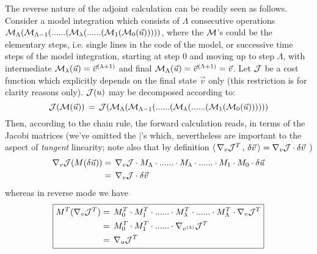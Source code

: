 The {\sf reverse} nature of the adjoint calculation can be readily 
seen as follows. 
Consider a model integration which consists of $ \Lambda $
consecutive operations
$ {\cal M}_{\Lambda} (  {\cal M}_{\Lambda-1} ( 
...... ( {\cal M}_{\lambda} (
......
( {\cal M}_{1} ( {\cal M}_{0}(\vec{u}) )))) $,
where the ${\cal M}$'s could be the elementary steps, i.e. single lines
in the code of the model, or successive time steps of the
model integration, 
starting at step 0 and moving up to step $\Lambda$, with intermediate
${\cal M}_{\lambda} (\vec{u}) = \vec{v}^{(\lambda+1)}$ and final 
${\cal M}_{\Lambda} (\vec{u}) = \vec{v}^{(\Lambda+1)} = \vec{v}$.
Let ${\cal J}$ be a cost function which explicitly depends on the
final state $\vec{v}$ only
(this restriction is for clarity reasons only).
%
${\cal J}(u)$ may be decomposed according to:
%
\begin{equation}
{\cal J}({\cal M}(\vec{u})) \, = \, 
{\cal J} ( {\cal M}_{\Lambda} (  {\cal M}_{\Lambda-1} ( 
...... ( {\cal M}_{\lambda} (
......
( {\cal M}_{1} ( {\cal M}_{0}(\vec{u}) )))))
\label{compos}
\end{equation}
%
Then, according to the chain rule, the forward calculation reads, 
in terms of the Jacobi matrices
(we've omitted the $ | $'s which, nevertheless are important
to the aspect of {\it tangent} linearity;
note also that by definition
$ \langle \, \nabla _{v}{\cal J}^T \, , \, \delta \vec{v} \, \rangle
= \nabla_v {\cal J} \cdot \delta \vec{v} $ )
%
\begin{equation}
\begin{split}
\nabla_v {\cal J} (M(\delta \vec{u})) & = \,
\nabla_v {\cal J} \cdot M_{\Lambda}
\cdot ...... \cdot M_{\lambda} \cdot ...... \cdot
M_{1} \cdot M_{0} \cdot \delta \vec{u} \\
~ & = \, \nabla_v {\cal J} \cdot \delta \vec{v} \\
\end{split}
\label{forward}
\end{equation}
%
whereas in reverse mode we have
%
\begin{equation}
\boxed{
\begin{split}
M^T ( \nabla_v {\cal J}^T) & = \,
M_{0}^T \cdot M_{1}^T
\cdot ...... \cdot M_{\lambda}^T \cdot ...... \cdot 
M_{\Lambda}^T \cdot \nabla_v {\cal J}^T \\
~ & = \, M_{0}^T \cdot M_{1}^T
\cdot ...... \cdot 
\nabla_{v^{(\lambda)}} {\cal J}^T \\
~ & = \, \nabla_u {\cal J}^T
\end{split}
}
\label{reverse}
\end{equation}

